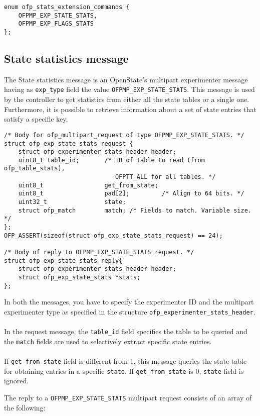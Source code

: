 \scriptsize\begin{verbatim}
enum ofp_stats_extension_commands {
    OFPMP_EXP_STATE_STATS,      
    OFPMP_EXP_FLAGS_STATS
};
\end{verbatim}\normalsize
\subsection{State statistics message}

The State statistics message is an OpenState's multipart experimenter message having as \texttt{exp\_type} field the value \texttt{OFPMP\_EXP\_STATE\_STATS}.
This message is used by the controller to get statistics from either all the state tables or a single one. Furthermore, it is possible to retrieve information about a set of state entries that satisfy a specific key.

\scriptsize\begin{verbatim}
/* Body for ofp_multipart_request of type OFPMP_EXP_STATE_STATS. */
struct ofp_exp_state_stats_request {
    struct ofp_experimenter_stats_header header;
    uint8_t table_id;       /* ID of table to read (from ofp_table_stats),
                               OFPTT_ALL for all tables. */
    uint8_t                 get_from_state;
    uint8_t                 pad[2];         /* Align to 64 bits. */
    uint32_t                state;   
    struct ofp_match        match; /* Fields to match. Variable size. */
};
OFP_ASSERT(sizeof(struct ofp_exp_state_stats_request) == 24);

/* Body of reply to OFPMP_EXP_STATE_STATS request. */
struct ofp_exp_state_stats_reply{
    struct ofp_experimenter_stats_header header;
    struct ofp_exp_state_stats *stats;
};
\end{verbatim}\normalsize
In both the messages, you have to specify the experimenter ID and the multipart experimenter type as specified in the structure \texttt{ofp\_experimenter\_stats\_header}.
\\\\In the request message, the \texttt{table\_id} field specifies the table to be queried and the \texttt{match} fields are used to selectively extract specific state entries.
\\\\If \texttt{get\_from\_state} field is different from 1, this message queries the state table for obtaining entries in a specific \texttt{state}. If \texttt{get\_from\_state} is 0, \texttt{state} field is ignored.

The reply to a \texttt{OFPMP\_EXP\_STATE\_STATS} multipart request consists of an array of the following:

